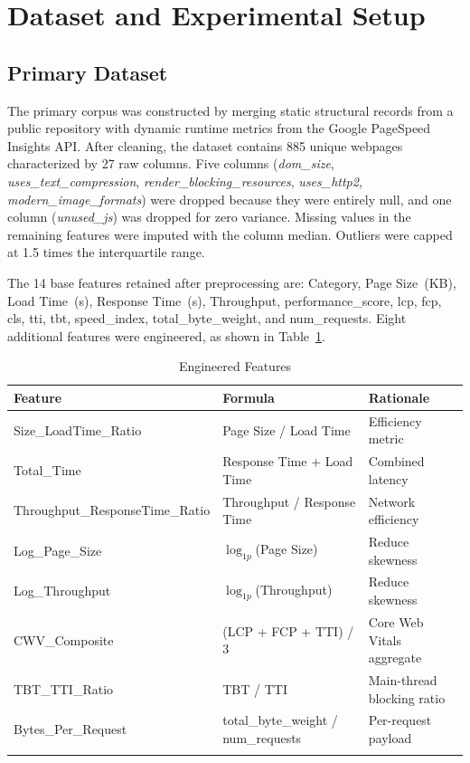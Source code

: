 \documentclass[sn-nature]{sn-jnl}
\begin{document}
\section{Dataset and Experimental Setup}\label{sec5}

\subsection{Primary Dataset}

The primary corpus was constructed by merging static structural records from a public repository with dynamic runtime metrics from the Google PageSpeed Insights API. After cleaning, the dataset contains 885 unique webpages characterized by 27 raw columns. Five columns (\textit{dom\_size}, \textit{uses\_text\_compression}, \textit{render\_blocking\_resources}, \textit{uses\_http2}, \textit{modern\_image\_formats}) were dropped because they were entirely null, and one column (\textit{unused\_js}) was dropped for zero variance. Missing values in the remaining features were imputed with the column median. Outliers were capped at 1.5 times the interquartile range.

The 14 base features retained after preprocessing are: Category, Page Size~(KB), Load Time~(s), Response Time~(s), Throughput, performance\_score, lcp, fcp, cls, tti, tbt, speed\_index, total\_byte\_weight, and num\_requests. Eight additional features were engineered, as shown in Table~\ref{tab:engineered_features}.

\begin{table}[htbp]
\caption{Engineered Features}\label{tab:engineered_features}
\centering
\begin{tabular}{p{} p{} p{}}
\toprule
Feature & Formula & Rationale \\
\midrule
Size\_LoadTime\_Ratio & Page Size / Load Time & Efficiency metric \\
Total\_Time & Response Time + Load Time & Combined latency \\
Throughput\_ResponseTime\_Ratio & Throughput / Response Time & Network efficiency \\
Log\_Page\_Size & $\log_{1p}$(Page Size) & Reduce skewness \\
Log\_Throughput & $\log_{1p}$(Throughput) & Reduce skewness \\
CWV\_Composite & (LCP + FCP + TTI) / 3 & Core Web Vitals aggregate \\
TBT\_TTI\_Ratio & TBT / TTI & Main-thread blocking ratio \\
Bytes\_Per\_Request & total\_byte\_weight / num\_requests & Per-request payload \\
\botrule
\end{tabular}
\end{table}
\end{document}
